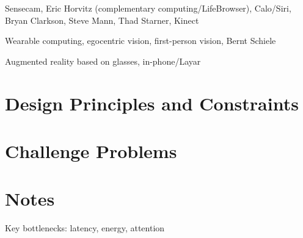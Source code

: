 \documentclass{ubicomp2012}
\begin{document}
Sensecam, Eric Horvitz (complementary computing/LifeBrowser),
Calo/Siri, Bryan Clarkson, Steve Mann, Thad Starner, Kinect
 
Wearable computing, egocentric vision, first-person vision, Bernt
Schiele

Augmented reality based on glasses, in-phone/Layar

\section{Design Principles and Constraints}

\section{Challenge Problems}

\section{Notes}
\itemize
\item {Key bottlenecks: latency, energy, attention}


\nocite{example-journal,example-abstracts,example-conference2}



\end{document}
